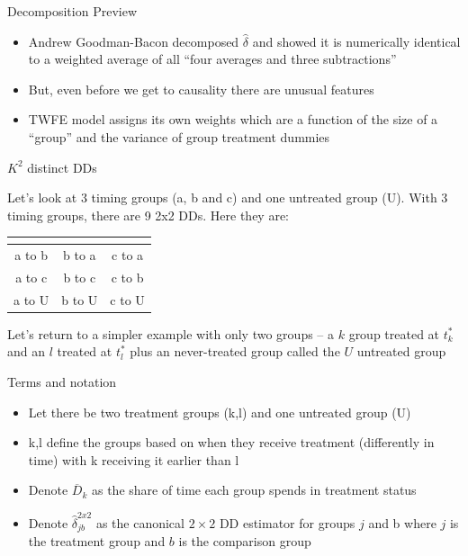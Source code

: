 \documentclass{beamer}
\begin{document}
\begin{frame}{Decomposition Preview}


\begin{itemize}
\item Andrew Goodman-Bacon decomposed $\widehat{\delta}$ and showed it is numerically identical to a weighted average of all ``four averages and three subtractions''
\item But, even before we get to causality there are unusual features
\item TWFE model assigns its own weights which are a function of the size of a ``group'' and the variance of group treatment dummies
\end{itemize}

\end{frame}



\begin{frame}{$K^2$ distinct DDs}

Let's look at 3 timing groups (a, b and c) and one untreated group (U).  With 3 timing groups, there are 9 2x2 DDs.  Here they are:


\begin{center}
\begin{tabular}{c|c|c}
\multicolumn{1}{l}{} &
\multicolumn{1}{l}{} &
\multicolumn{1}{l}{} \\
\midrule
a to b & b to a & c to a \\
a to c & b to c & c to b \\
a to U & b to U & c to U \\
\midrule
\end{tabular}
\end{center}

\bigskip

Let's return to a simpler example with only two groups -- a $k$ group treated at $t_k^*$ and an $l$ treated at $t_l^*$ plus an never-treated group called the $U$ untreated group
\end{frame} 


\begin{frame}{Terms and notation}

\begin{itemize}
\item Let there be two treatment groups (k,l) and one untreated group (U)
\item k,l define the groups based on when they receive treatment (differently in time) with k receiving it earlier than l
\item Denote $\overline{D}_k$ as the share of time each group spends in treatment status
\item Denote $\widehat{\delta}_{jb}^{2x2}$ as the canonical $2\times 2$ DD estimator for groups $j$ and b where $j$ is the treatment group and $b$ is the comparison group
\end{itemize}

\end{frame}
\end{document}
